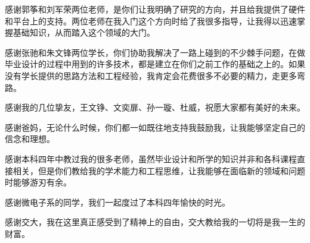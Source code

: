 \begin{thanks}

感谢郭筝和刘军荣两位老师，是你们让我明确了研究的方向，并且给我提供了硬件和平台上的支持。两位老师在我入门这个方向时给了我很多指导，让我得以迅速掌握基础知识，从而踏入这个领域的大门。

感谢张驰和朱文锋两位学长，你们协助我解决了一路上碰到的不少棘手问题，在做毕业设计的过程中用到的许多技术，都是建立在你们之前工作的基础之上的。如果没有学长提供的思路方法和工程经验，我肯定会花费很多不必要的精力，走更多弯路。

感谢我的几位挚友，王文铮、文奕扉、孙一璇、杜威，祝愿大家都有美好的未来。

感谢爸妈，无论什么时候，你们都一如既往地支持我鼓励我，让我能够坚定自己的信念和理想。

感谢本科四年中教过我的很多老师，虽然毕业设计和所学的知识并非和各科课程直接相关，但是你们教给我的学术能力和工程思维，让我能够在面临新的领域和问题时能够游刃有余。

感谢微电子系的同学，我们一起度过了本科四年愉快的时光。

感谢交大，我在这里真正感受到了精神上的自由，交大教给我的一切将是我一生的财富。


\end{thanks}
